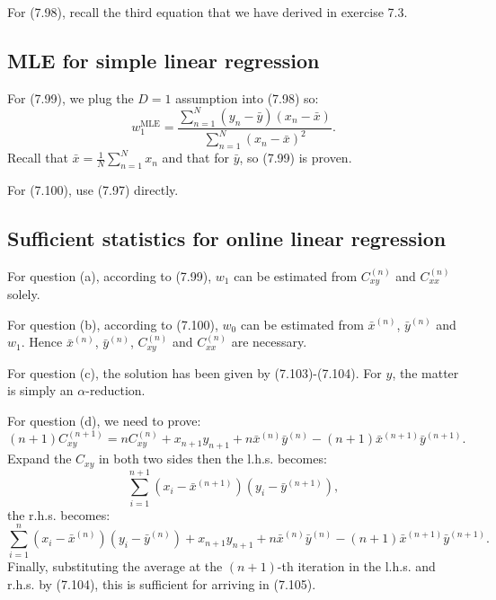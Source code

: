 \documentclass[UTF8]{ctexart}
\begin{document}
For (7.98), recall the third equation that we have derived in exercise 7.3.

\subsection{MLE for simple linear regression}
For (7.99), we plug the $D=1$ assumption into (7.98) so:
$$w_{1}^{\text{MLE}}=\frac{\sum_{n=1}^{N}(y_{n}-\bar{y})(x_{n}-\bar{x})}{\sum_{n=1}^{N}(x_{n}-\bar{x})^{2}}.$$
Recall that $\bar{x}=\frac{1}{N}\sum_{n=1}^{N}x_{n}$ and that for $\bar{y}$, so (7.99) is proven.

For (7.100), use (7.97) directly.

\subsection{Sufficient statistics for online linear regression}
For question (a), according to (7.99), $w_{1}$ can be estimated from $C_{xy}^{(n)}$ and $C_{xx}^{(n)}$ solely.

For question (b), according to (7.100), $w_{0}$ can be estimated from $\bar{x}^{(n)}$, $\bar{y}^{(n)}$ and $w_{1}$.
Hence $\bar{x}^{(n)}$, $\bar{y}^{(n)}$, $C_{xy}^{(n)}$ and $C_{xx}^{(n)}$ are necessary.

For question (c), the solution has been given by (7.103)-(7.104).
For $y$, the matter is simply an $\alpha$-reduction.

For question (d), we need to prove:
$$(n+1)C_{xy}^{(n+1)}=nC_{xy}^{(n)}+x_{n+1}y_{n+1}+n\bar{x}^{(n)}\bar{y}^{(n)}-(n+1)\bar{x}^{(n+1)}\bar{y}^{(n+1)}.$$
Expand the $C_{xy}$ in both two sides then the l.h.s. becomes:
$$\sum_{i=1}^{n+1}(x_{i}-\bar{x}^{(n+1)})(y_{i}-\bar{y}^{(n+1)}),$$
the r.h.s. becomes:
$$\sum_{i=1}^{n}(x_{i}-\bar{x}^{(n)})(y_{i}-\bar{y}^{(n)})+x_{n+1}y_{n+1}+n\bar{x}^{(n)}\bar{y}^{(n)}-(n+1)\bar{x}^{(n+1)}\bar{y}^{(n+1)}.$$
Finally, substituting the average at the $(n+1)$-th iteration in the l.h.s. and r.h.s. by (7.104), this is sufficient for arriving in (7.105).
\end{document}
